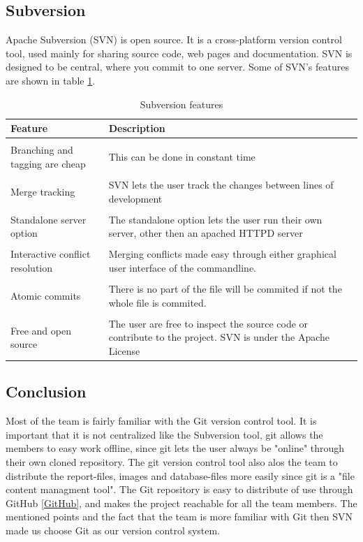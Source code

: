 \subsection{Subversion}
Apache Subversion (SVN) is open source. It is a cross-platform version control tool, used mainly for sharing source code, web pages and documentation. SVN is designed to be central, where you commit to one server. Some of SVN's features are shown in table \ref{table-subversionfeatures}.

\begin{table}
\centering
\begin{tabularx}{\textwidth}{ l X l }
  \textbf{Feature}      & \textbf{Description} \\
  \hline \\ [-1.5ex]
  Branching and tagging are cheap   & This can be done in constant time \vspace*{0.7ex} \\
  \hline \\ [-1.5ex]
  Merge tracking                    & SVN lets the user track the changes between lines of development \\
  \hline \\ [-1.5ex]
  Standalone server option          & The standalone option lets the user run their own server, other then an apached HTTPD server \\
  \hline \\ [-1.5ex]
  Interactive conflict resolution   & Merging conflicts made easy through either graphical user interface of the commandline. \\
  \hline \\ [-1.5ex]
  Atomic commits                    & There is no part of the file will be commited if not the whole file is commited. \\
  \hline \\ [-1.5ex]
  Free and open source              & The user are free to inspect the source code or contribute to the project. SVN is under the Apache License \\
\end{tabularx}
\caption{Subversion features}
\label{table-subversionfeatures}
\end{table}


\subsection{Conclusion}
Most of the team is fairly familiar with the Git version control tool. It is important that it is not centralized like the Subversion tool, git allows the members to easy work offline, since git lets the user always be "online" through their own cloned repository.
The git version control tool also alos the team to distribute the report-files, images and database-files more easily since git is a "file content managment tool".
The Git repository is easy to distribute of use through GitHub \ref{GitHub}, and makes the project reachable for all the team members.
The mentioned points and the fact that the team is more familiar with Git then SVN made us choose Git as our version control system.

